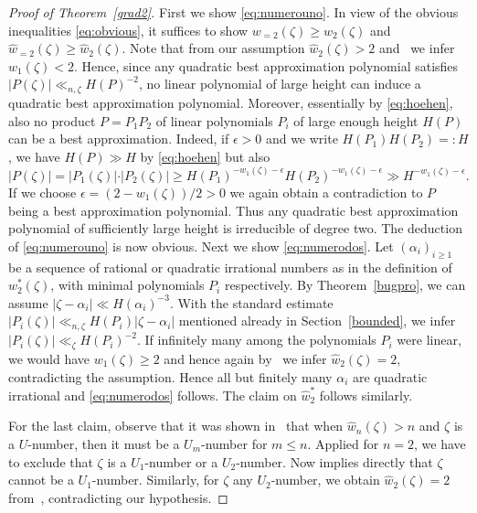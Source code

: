 \documentclass[12pt]{amsart}
\theoremstyle{definition}
\begin{document}
\begin{proof}[Proof of Theorem~\ref{grad2}]
First we show \eqref{eq:numerouno}.
In view of the obvious inequalities \eqref{eq:obvious}, it suffices to show $w_{=2}(\zeta)\geq w_{2}(\zeta)$
and $\widehat{w}_{=2}(\zeta)\geq \widehat{w}_{2}(\zeta)$.
Note that from our assumption $\widehat{w}_{2}(\zeta)>2$
and~\cite[Theorem~5.1]{j3} we infer $w_{1}(\zeta)<2$. 
Hence, since any quadratic best approximation polynomial satisfies $\vert P(\zeta)\vert\ll_{n,\zeta} H(P)^{-2}$,
no linear polynomial of large height can induce a quadratic best approximation polynomial. 
Moreover, essentially by \eqref{eq:hoehen}, also no product $P=P_{1}P_{2}$ of linear polynomials $P_{i}$
of large enough height $H(P)$ can be a best approximation. 
Indeed, if $\epsilon>0$ and we write
$H(P_{1})H(P_{2})=:H$, we have $H(P)\gg H$ by \eqref{eq:hoehen} but also
%
\[
 \vert P(\zeta)\vert= \vert P_{1}(\zeta)\vert\cdot \vert P_{2}(\zeta)\vert
\geq H(P_{1})^{-w_{1}(\zeta)-\epsilon}H(P_{2})^{-w_{1}(\zeta)-\epsilon}\gg H^{-w_{1}(\zeta)-\epsilon}.
\]
% 
If we choose $\epsilon=(2-w_{1}(\zeta))/2>0$ we again obtain a contradiction to $P$ being a best approximation polynomial.
Thus any quadratic best approximation polynomial of sufficiently large height 
is irreducible of degree two. The deduction of \eqref{eq:numerouno} is now obvious.
Next we show \eqref{eq:numerodos}. Let $(\alpha_{i})_{i\geq 1}$ be a sequence of rational or
quadratic irrational numbers as in the definition of
$w_{2}^{\ast}(\zeta)$,  with minimal polynomials $P_{i}$ 
respectively. By Theorem~\ref{bugpro}, we can assume
$\vert\zeta-\alpha_{i}\vert \ll H(\alpha_{i})^{-3}$.
With the standard estimate $\vert P_{i}(\zeta)\vert \ll_{n,\zeta} H(P_{i})\vert \zeta-\alpha_{i}\vert$ 
mentioned already in Section~\ref{bounded},
we infer $\vert P_{i}(\zeta)\vert\ll_{\zeta} H(P_{i})^{-2}$.
If infinitely many among the polynomials $P_{i}$ were linear, we would have $w_{1}(\zeta)\geq 2$
and hence again by~\cite[Theorem~5.1]{j3} we infer $\widehat{w}_{2}(\zeta)=2$, contradicting the assumption.
Hence all but finitely many $\alpha_{i}$ are quadratic irrational and \eqref{eq:numerodos} follows. The 
claim on $\widehat{w}_{2}^{\ast}$ follows similarly.

For the last claim, observe that it was shown 
in~\cite[Th\'{e}or\`{e}me~5.3]{adambug} that 
when $\widehat{w}_{n}(\zeta)>n$
and $\zeta$ is a $U$-number, then it must be a $U_{m}$-number 
for $m\leq n$. Applied for $n=2$,
we have to exclude that $\zeta$ is a $U_{1}$-number or a $U_{2}$-number.
Now \cite[Theorem~5.1]{j3} implies directly that $\zeta$ cannot be a $U_{1}$-number. Similarly,
for $\zeta$ any $U_{2}$-number, we obtain $\widehat{w}_{2}(\zeta)=2$ from~\cite[Corollary~2.5]{bschlei}, contradicting our hypothesis.
\end{proof}
\end{document}
